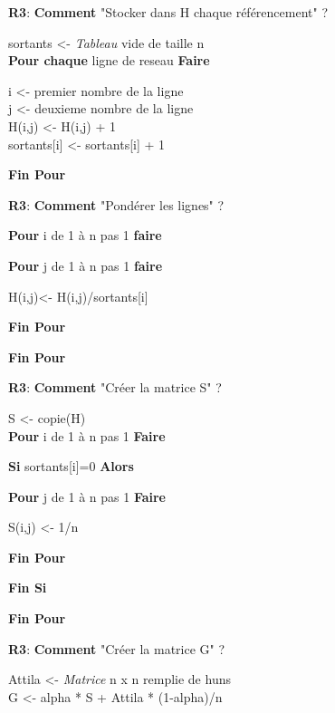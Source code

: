 \documentclass{NewTeXRaffinage}
\begin{document}
\textbf{R3}: \textbf{Comment} "Stocker dans H chaque référencement" ?
\begin{addmargin}[5em]{0pt}
    sortants <- \textit{Tableau} vide de taille n \\
    \textbf{Pour chaque} ligne de reseau \textbf{Faire}
        \begin{addmargin}[3em]{0pt}
            i <- premier nombre de la ligne \\
            j <- deuxieme nombre de la ligne \\
            H(i,j) <- H(i,j) + 1 \\
            sortants[i] <- sortants[i] + 1
        \end{addmargin}
    \textbf{Fin Pour}
\end{addmargin}

\textbf{R3}: \textbf{Comment} "Pondérer les lignes" ?
\begin{addmargin}[5em]{0pt}
    \textbf{Pour} i de 1 à n pas 1 \textbf{faire}
        \begin{addmargin}[3em]{0pt}
            \textbf{Pour} j de 1 à n pas 1 \textbf{faire}
            \begin{addmargin}[3em]{0pt}
                H(i,j)<- H(i,j)/sortants[i]
            \end{addmargin}
            \textbf{Fin Pour}
        \end{addmargin}
    \textbf{Fin Pour}
\end{addmargin}

\textbf{R3}: \textbf{Comment} "Créer la matrice S" ?
\begin{addmargin}[5em]{0pt}
    S <- copie(H) \\
    \textbf{Pour} i de 1 à n pas 1 \textbf{Faire}
        \begin{addmargin}[3em]{0pt}
        \textbf{Si} sortants[i]=0  \textbf{Alors}
            \begin{addmargin}[3em]{0pt}
            \textbf{Pour} j de 1 à n pas 1 \textbf{Faire}
                \begin{addmargin}[3em]{0pt}
                S(i,j) <- 1/n
                \end{addmargin}
            \textbf{Fin Pour}
            \end{addmargin}
        \textbf{Fin Si}
        \end{addmargin}
    \textbf{Fin Pour}
\end{addmargin}

\textbf{R3}: \textbf{Comment} "Créer la matrice G" ?
\begin{addmargin}[5em]{0pt}
    Attila <- \textit{Matrice} n x n remplie de huns \\
    G <- alpha * S + Attila * (1-alpha)/n
\end{addmargin}
\end{document}
